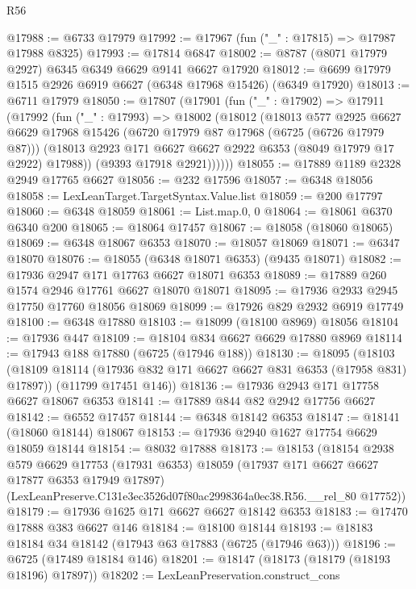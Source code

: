 \begin{lexlean}{R56}
\begin{coremodule}
@17988 := @6733 @17979
@17992 := @17967 (fun ("_" : @17815) => @17987 @17988 @8325)
@17993 := @17814 @6847
@18002 := @8787 (@8071 @17979 @2927) @6345 @6349 @6629 @9141 @6627 @17920
@18012 := @6699 @17979 @1515 @2926 @6919 @6627 (@6348 @17968 @15426) (@6349 @17920)
@18013 := @6711 @17979
@18050 := @17807
    (@17901
      (fun ("_" : @17902) =>
      @17911
        (@17992
          (fun ("_" : @17993) =>
          @18002
            (@18012
              (@18013
                @577
                @2925
                @6627
                @6629
                @17968
                @15426
                (@6720 @17979 @87 @17968 (@6725 (@6726 @17979 @87)))
                (@18013 @2923 @171 @6627 @6627 @2922 @6353 (@8049 @17979 @17 @2922) @17988))
              (@9393 @17918 @2921))))))
@18055 := @17889 @1189 @2328 @2949 @17765 @6627
@18056 := @232 @17596
@18057 := @6348 @18056
@18058 := LexLeanTarget.TargetSyntax.Value.list
@18059 := @200 @17797
@18060 := @6348 @18059
@18061 := List.map.{0, 0}
@18064 := @18061 @6370 @6340 @200
@18065 := @18064 @17457
@18067 := @18058 (@18060 @18065)
@18069 := @6348 @18067 @6353
@18070 := @18057 @18069
@18071 := @6347 @18070
@18076 := @18055 (@6348 @18071 @6353) (@9435 @18071)
@18082 := @17936 @2947 @171 @17763 @6627 @18071 @6353
@18089 := @17889 @260 @1574 @2946 @17761 @6627 @18070 @18071
@18095 := @17936 @2933 @2945 @17750 @17760 @18056 @18069
@18099 := @17926 @829 @2932 @6919 @17749
@18100 := @6348 @17880
@18103 := @18099 (@18100 @8969) @18056
@18104 := @17936 @447
@18109 := @18104 @834 @6627 @6629 @17880 @8969
@18114 := @17943 @188 @17880 (@6725 (@17946 @188))
@18130 := @18095
    (@18103
      (@18109 @18114 (@17936 @832 @171 @6627 @6627 @831 @6353 (@17958 @831) @17897))
      (@11799 @17451 @146))
@18136 := @17936 @2943 @171 @17758 @6627 @18067 @6353
@18141 := @17889 @844 @82 @2942 @17756 @6627
@18142 := @6552 @17457
@18144 := @6348 @18142 @6353
@18147 := @18141 (@18060 @18144) @18067
@18153 := @17936 @2940 @1627 @17754 @6629 @18059 @18144
@18154 := @8032 @17888
@18173 := @18153
    (@18154
      @2938
      @579
      @6629
      @17753
      (@17931 @6353)
      @18059
      (@17937 @171 @6627 @6627 @17877 @6353 @17949 @17897)
      (LexLeanPreserve.C131e3ec3526d07f80ac2998364a0ec38.R56.__rel_80 @17752))
@18179 := @17936 @1625 @171 @6627 @6627 @18142 @6353
@18183 := @17470 @17888 @383 @6627 @146
@18184 := @18100 @18144
@18193 := @18183 @18184 @34 @18142 (@17943 @63 @17883 (@6725 (@17946 @63)))
@18196 := @6725 (@17489 @18184 @146)
@18201 := @18147 (@18173 (@18179 (@18193 @18196) @17897))
@18202 := LexLeanPreservation.construct_cons

\end{coremodule}
\end{lexlean}
